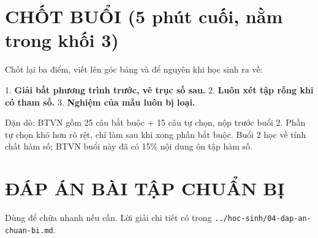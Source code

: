 \documentclass[11pt, a4paper]{article}
\begin{document}

\section{CHỐT BUỔI (5 phút cuối, nằm trong khối 3)}

Chốt lại ba điểm, viết lên góc bảng và để nguyên khi học sinh ra về:

1. \textbf{Giải bất phương trình trước, vẽ trục số sau.}
2. \textbf{Luôn xét tập rỗng khi có tham số.}
3. \textbf{Nghiệm của mẫu luôn bị loại.}

Dặn dò: BTVN gồm 25 câu bắt buộc + 15 câu tự chọn, nộp trước buổi 2. Phần tự chọn khó hơn rõ rệt, chỉ làm sau khi xong phần bắt buộc. Buổi 2 học về tính chất hàm số; BTVN buổi này đã có 15\% nội dung ôn tập hàm số.

\section{ĐÁP ÁN BÀI TẬP CHUẨN BỊ}

Dùng để chữa nhanh nếu cần. Lời giải chi tiết có trong \texttt{../hoc-sinh/04-dap-an-chuan-bi.md}.

\end{document}
